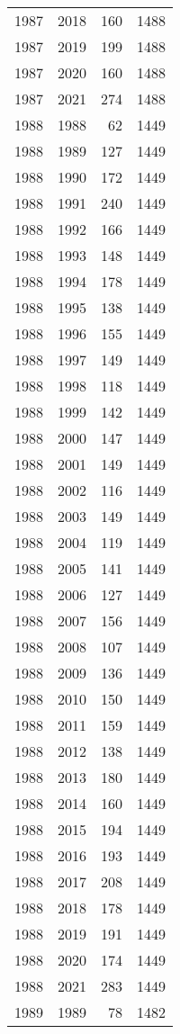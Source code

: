 \documentclass[
  11pt,
  letterpaper,
  DIV=11,
  numbers=noendperiod,
  twoside]{scrartcl}
\begin{document}
\begin{longtable}[]{@{}rrrr@{}}
1987 & 2018 & 160 & 1488 \\
1987 & 2019 & 199 & 1488 \\
1987 & 2020 & 160 & 1488 \\
1987 & 2021 & 274 & 1488 \\
1988 & 1988 & 62 & 1449 \\
1988 & 1989 & 127 & 1449 \\
1988 & 1990 & 172 & 1449 \\
1988 & 1991 & 240 & 1449 \\
1988 & 1992 & 166 & 1449 \\
1988 & 1993 & 148 & 1449 \\
1988 & 1994 & 178 & 1449 \\
1988 & 1995 & 138 & 1449 \\
1988 & 1996 & 155 & 1449 \\
1988 & 1997 & 149 & 1449 \\
1988 & 1998 & 118 & 1449 \\
1988 & 1999 & 142 & 1449 \\
1988 & 2000 & 147 & 1449 \\
1988 & 2001 & 149 & 1449 \\
1988 & 2002 & 116 & 1449 \\
1988 & 2003 & 149 & 1449 \\
1988 & 2004 & 119 & 1449 \\
1988 & 2005 & 141 & 1449 \\
1988 & 2006 & 127 & 1449 \\
1988 & 2007 & 156 & 1449 \\
1988 & 2008 & 107 & 1449 \\
1988 & 2009 & 136 & 1449 \\
1988 & 2010 & 150 & 1449 \\
1988 & 2011 & 159 & 1449 \\
1988 & 2012 & 138 & 1449 \\
1988 & 2013 & 180 & 1449 \\
1988 & 2014 & 160 & 1449 \\
1988 & 2015 & 194 & 1449 \\
1988 & 2016 & 193 & 1449 \\
1988 & 2017 & 208 & 1449 \\
1988 & 2018 & 178 & 1449 \\
1988 & 2019 & 191 & 1449 \\
1988 & 2020 & 174 & 1449 \\
1988 & 2021 & 283 & 1449 \\
1989 & 1989 & 78 & 1482 \\

\end{longtable}
\end{document}
